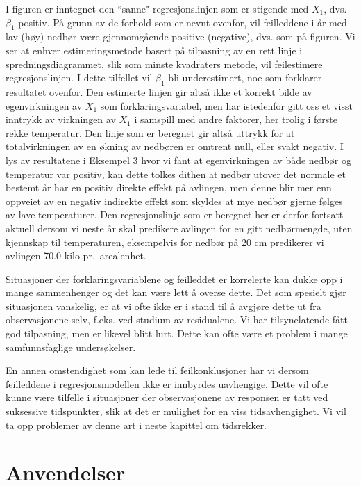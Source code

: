 I figuren er inntegnet den ``sanne" regresjonslinjen som er stigende med 
$X_1$, dvs. ${\beta}_1$ positiv.  På grunn av de forhold som er nevnt
ovenfor, vil feilleddene i år med lav (høy) nedbør være
gjennomgående positive (negative), dvs. som på figuren.  Vi ser
at enhver estimeringsmetode basert på tilpasning av en rett linje i
spredningsdiagrammet, slik som minste kvadraters metode, vil feilestimere
regresjonslinjen.  I dette tilfellet vil ${\beta}_1$ bli underestimert,
noe som forklarer resultatet ovenfor.  Den estimerte linjen gir altså
ikke et korrekt bilde av egenvirkningen av $X_1$ som forklaringsvariabel,
men har istedenfor gitt oss et visst inntrykk av virkningen av $X_1$ i
samspill med andre faktorer, her trolig i første rekke temperatur.
Den linje som er beregnet gir altså uttrykk for at totalvirkningen av
en økning av nedbøren er omtrent null, eller svakt negativ.  I lys
av resultatene i Eksempel 3 hvor vi fant at egenvirkningen av både 
nedbør og temperatur var positiv, kan dette tolkes dithen at nedbør
utover det normale et bestemt år har en positiv direkte effekt på
avlingen, men denne blir mer enn oppveiet av en negativ indirekte effekt
som skyldes at mye nedbør gjerne følges av lave temperaturer.  Den
regresjonslinje som er beregnet her er derfor fortsatt aktuell dersom vi
neste år skal predikere avlingen for en gitt nedbørmengde, uten 
kjennskap til temperaturen, eksempelvis for nedbør på 20 cm
predikerer vi avlingen 70.0 kilo pr.~arealenhet.

Situasjoner der forklaringsvariablene og feilleddet er korrelerte kan dukke
opp i mange sammenhenger og det kan være lett å overse dette.  Det
som spesielt gjør situasjonen vanskelig, er at vi ofte ikke er i stand til 
å avgjøre dette ut fra observasjonene selv, f.eks. ved studium av
residualene.  Vi har tilsynelatende fått god tilpasning, men er likevel
blitt lurt. Dette kan ofte være et problem i mange samfunnsfaglige
undersøkelser.

  En annen omstendighet som kan lede til feilkonklusjoner
har vi dersom feilleddene i regresjonsmodellen ikke er innbyrdes uavhengige.
Dette vil ofte kunne være tilfelle i situasjoner der observasjonene av
responsen er tatt ved suksessive tidspunkter, slik at det er mulighet for 
en viss tidsavhengighet.  Vi vil ta opp problemer av denne art i neste 
kapittel om tidsrekker.



\section{Anvendelser}


